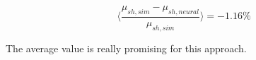  \begin{equation}
\langle{ \frac{\mu_{sh,sim}-\mu_{sh,neural}}{\mu_{sh,sim}}}\rangle = -1.16 \%
\end{equation}

The average value is really promising for this approach.

